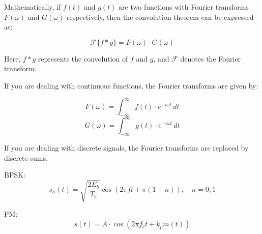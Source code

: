 \documentclass[14pt, a4paper]{extarticle}
\begin{document}
Mathematically, if \( f(t) \) and \( g(t) \) are two functions with Fourier transforms \( F(\omega) \) and \( G(\omega) \) respectively, then the convolution theorem can be expressed as:

\[ \mathcal{F}\{f * g\} = F(\omega) \cdot G(\omega) \]

Here, \( f * g \) represents the convolution of \( f \) and \( g \), and \( \mathcal{F} \) denotes the Fourier transform.

If you are dealing with continuous functions, the Fourier transforms are given by:

\[ F(\omega) = \int_{-\infty}^{\infty} f(t) \cdot e^{-i \omega t} \, dt \]
\[ G(\omega) = \int_{-\infty}^{\infty} g(t) \cdot e^{-i \omega t} \, dt \]

If you are dealing with discrete signals, the Fourier transforms are replaced by discrete sums.

\newpage

\par BPSK:
\[
s_{n}(t) = \sqrt{\frac{2E_{b}}{T_{b}}} \cos\left(2\pi ft + \pi(1-n)\right), \quad n=0,1
\]

\par PM:
\[
s(t) = A \cdot \cos(2\pi f_c t + k_p m(t))
\]
\end{document}
